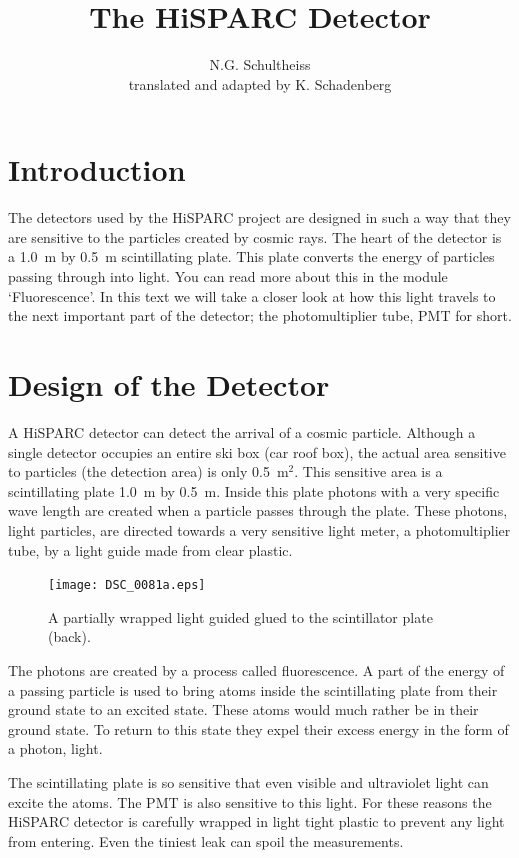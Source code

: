 \documentclass[12pt,a4paper]{article}
\author{N.G. Schultheiss \\ translated and adapted by K. Schadenberg}
\date{}
\title{The HiSPARC Detector}
\numberwithin{equation}{section}
\numberwithin{figure}{section}
\numberwithin{table}{section}
\begin{document}
\maketitle

\section{Introduction}
The detectors used by the HiSPARC project are designed in such a way that they are sensitive to the particles created by cosmic rays. The heart of the detector is a 1.0~m by 0.5~m scintillating plate. This plate converts the energy of particles passing through into light. You can read more about this in the module `Fluorescence'. In this text we will take a closer look at how this light travels to the next important part of the detector; the photomultiplier tube, PMT for short.

\section{Design of the Detector}
A HiSPARC detector can detect the arrival of a cosmic particle. Although a single detector occupies an entire ski box (car roof box), the actual area sensitive to particles (the detection area) is only 0.5~m$^2$. This sensitive area is a scintillating plate 1.0~m by 0.5~m. Inside this plate photons with a very specific wave length are created when a particle passes through the plate. These photons, light particles, are directed towards a very sensitive light meter, a photomultiplier tube, by a light guide made from clear plastic.

\begin{figure}[h]\begin{center}
\texttt{[image: DSC\_0081a.eps]}%
\caption{A partially wrapped light guided glued to the scintillator plate (back). }\label{fig:light_guide}
\end{center}\end{figure}

The photons are created by a process called fluorescence. A part of the energy of a passing particle is used to bring atoms inside the scintillating plate from their ground state to an excited state. These atoms would much rather be in their ground state. To return to this state they expel their excess energy in the form of a photon, light.

The scintillating plate is so sensitive that even visible and ultraviolet light can excite the atoms. The PMT is also sensitive to this light. For these reasons the HiSPARC detector is carefully wrapped in light tight plastic to prevent any light from entering. Even the tiniest leak can spoil the measurements.
\end{document}
